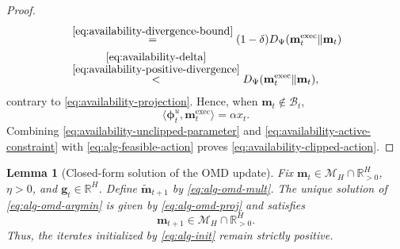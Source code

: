 \documentclass[journal]{IEEEtran}
\newtheorem{lemma}{Lemma}
\theoremstyle{remark}
\begin{document}
\begin{proof}
\begin{align*}
&\overset{\eqref{eq:availability-divergence-bound}}{=}
(1-\delta)D_\Psi(\mathbf{m}_t^{\mathrm{exec}}\|\mathbf{m}_t)
\\
&\overset{\substack{\eqref{eq:availability-delta}\\
\eqref{eq:availability-positive-divergence}}}{<}
D_\Psi(\mathbf{m}_t^{\mathrm{exec}}\|\mathbf{m}_t),
\end{align*}
contrary to \eqref{eq:availability-projection}. Hence, when
$\mathbf{m}_t\notin\mathcal{B}_t$,
\begin{equation}
\label{eq:availability-active-constraint}
\langle\boldsymbol{\phi}_t^u,\mathbf{m}_t^{\mathrm{exec}}\rangle
=\alpha x_t.
\end{equation}
Combining \eqref{eq:availability-unclipped-parameter} and
\eqref{eq:availability-active-constraint} with \eqref{eq:alg-feasible-action}
proves \eqref{eq:availability-clipped-action}.
\end{proof}

\begin{lemma}[Closed-form solution of the OMD update]
\label{lem:omd-closed-form}
Fix $\mathbf{m}_t\in\mathcal{M}_H\cap\mathbb{R}_{>0}^H$, $\eta>0$, and
$\mathbf{g}_t\in\mathbb{R}^H$. Define $\widetilde{\mathbf{m}}_{t+1}$ by
\eqref{eq:alg-omd-mult}. The unique solution of
\eqref{eq:alg-omd-argmin} is given by \eqref{eq:alg-omd-proj} and satisfies
\begin{equation}
\label{eq:omd-interior-update}
\mathbf{m}_{t+1}\in\mathcal{M}_H\cap\mathbb{R}_{>0}^H.
\end{equation}
Thus, the iterates initialized by \eqref{eq:alg-init} remain strictly positive.
\end{lemma}
\end{document}
